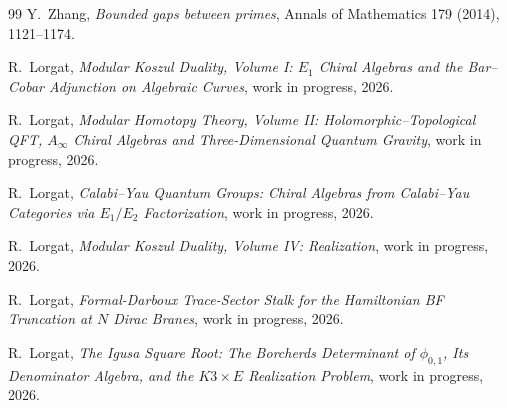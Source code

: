 \documentclass[11pt]{article}
\theoremstyle{definition}
\theoremstyle{remark}
\newcommand{\1}{\mathbf 1}
\begin{document}
\begin{thebibliography}{99}
Y.~Zhang,
\emph{Bounded gaps between primes},
Annals of Mathematics 179 (2014), 1121--1174.

R.~Lorgat,
\emph{Modular Koszul Duality, Volume I: $E_1$ Chiral Algebras and the Bar--Cobar Adjunction on Algebraic Curves},
work in progress, 2026.

R.~Lorgat,
\emph{Modular Homotopy Theory, Volume II: Holomorphic--Topological QFT, $A_\infty$ Chiral Algebras and Three-Dimensional Quantum Gravity},
work in progress, 2026.

R.~Lorgat,
\emph{Calabi--Yau Quantum Groups: Chiral Algebras from Calabi--Yau Categories via $E_1/E_2$ Factorization},
work in progress, 2026.

R.~Lorgat,
\emph{Modular Koszul Duality, Volume IV: Realization},
work in progress, 2026.

R.~Lorgat,
\emph{Formal-Darboux Trace-Sector Stalk for the Hamiltonian BF Truncation at $N$ Dirac Branes},
work in progress, 2026.

R.~Lorgat,
\emph{The Igusa Square Root: The Borcherds Determinant of $\phi_{0,1}$, Its Denominator Algebra, and the $K3\times E$ Realization Problem},
work in progress, 2026.

\end{thebibliography}
\end{document}
